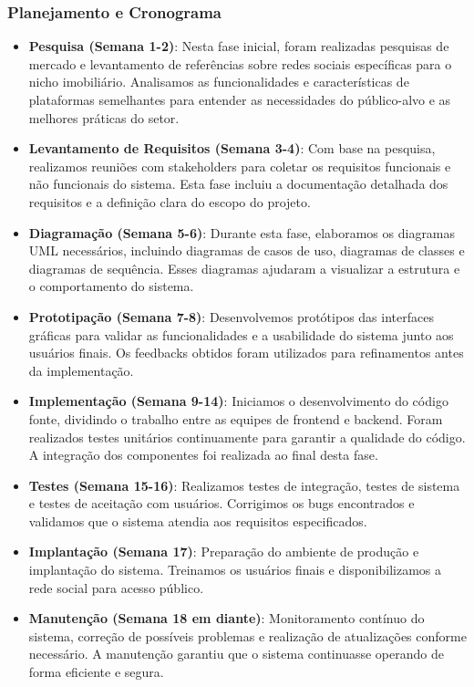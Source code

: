 \documentclass[../main.tex]{subfiles}
\begin{document}
\subsubsection{Planejamento e Cronograma}
\begin{itemize}
    \item \textbf{Pesquisa (Semana 1-2)}: Nesta fase inicial, foram realizadas pesquisas de mercado e levantamento de referências sobre redes sociais específicas para o nicho imobiliário. Analisamos as funcionalidades e características de plataformas semelhantes para entender as necessidades do público-alvo e as melhores práticas do setor.
    \item \textbf{Levantamento de Requisitos (Semana 3-4)}: Com base na pesquisa, realizamos reuniões com stakeholders para coletar os requisitos funcionais e não funcionais do sistema. Esta fase incluiu a documentação detalhada dos requisitos e a definição clara do escopo do projeto.
    \item \textbf{Diagramação (Semana 5-6)}: Durante esta fase, elaboramos os diagramas UML necessários, incluindo diagramas de casos de uso, diagramas de classes e diagramas de sequência. Esses diagramas ajudaram a visualizar a estrutura e o comportamento do sistema.
    \item \textbf{Prototipação (Semana 7-8)}: Desenvolvemos protótipos das interfaces gráficas para validar as funcionalidades e a usabilidade do sistema junto aos usuários finais. Os feedbacks obtidos foram utilizados para refinamentos antes da implementação.
    \item \textbf{Implementação (Semana 9-14)}: Iniciamos o desenvolvimento do código fonte, dividindo o trabalho entre as equipes de frontend e backend. Foram realizados testes unitários continuamente para garantir a qualidade do código. A integração dos componentes foi realizada ao final desta fase.
    \item \textbf{Testes (Semana 15-16)}: Realizamos testes de integração, testes de sistema e testes de aceitação com usuários. Corrigimos os bugs encontrados e validamos que o sistema atendia aos requisitos especificados.
    \item \textbf{Implantação (Semana 17)}: Preparação do ambiente de produção e implantação do sistema. Treinamos os usuários finais e disponibilizamos a rede social para acesso público.
    \item \textbf{Manutenção (Semana 18 em diante)}: Monitoramento contínuo do sistema, correção de possíveis problemas e realização de atualizações conforme necessário. A manutenção garantiu que o sistema continuasse operando de forma eficiente e segura.
\end{itemize}
\end{document}
